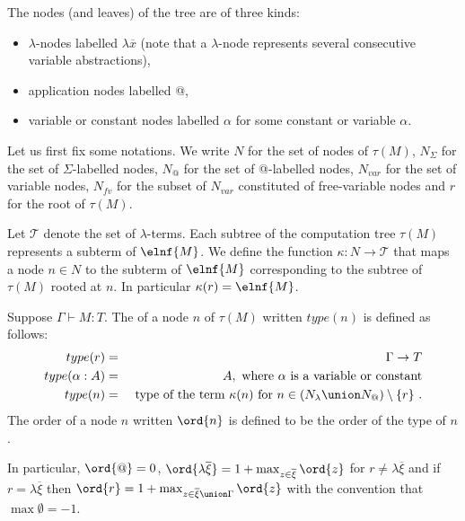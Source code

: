The nodes (and leaves) of the tree are of three kinds:
\begin{itemize}
\item $\lambda$-nodes labelled $\lambda \overline{x}$ (note that a $\lambda$-node represents several consecutive variable abstractions),
\item application nodes labelled @,
\item variable or constant nodes labelled $\alpha$ for some constant or variable $\alpha$.
\end{itemize}

Let us first fix some notations. We write $N$ for the set of nodes of $\tau(M)$, $N_\Sigma$ for the set of $\Sigma$-labelled nodes,
$N_@$ for the set of @-labelled nodes, $N_{var}$ for the set of variable nodes,
$N_{fv}$ for the subset of $N_{var}$ constituted of free-variable nodes and $r$ for the root of $\tau(M)$.

Let $\mathcal{T}$ denote the set of $\lambda$-terms.
Each subtree of the computation tree $\tau(M)$ represents a subterm of $\elnf{M}$.
We define the function $\kappa : N \rightarrow \mathcal{T}$ that maps a node $n \in N$ to the subterm of $\elnf{M}$
corresponding to the subtree of $\tau(M)$ rooted at $n$.
In particular $\kappa(r) = \elnf{M}$.

\begin{definition}
\label{def:nodeorder}
Suppose $\Gamma \vdash M : T$.
The  of a node $n$ of $\tau(M)$ written $type(n)$ is defined as follows:
\begin{eqnarray*}
type(r) &=& \Gamma \rightarrow T \\
type(\alpha:A) &=& A, \mbox{ where $\alpha$ is a variable or constant} \\
type(n) &=& \hbox{ type of the term $\kappa(n)$ for $n \in (N_\lambda \union N_@) \setminus \{r \}$\ .}
\end{eqnarray*}
The order of a node $n$ written $\ord{n}$ is defined to be the order of the type of $n$.
\end{definition}

In particular, $\ord{@} = 0$, $\ord{\lambda \overline{\xi}} = 1+ \max_{z\in \overline{\xi}} \ord{z}$ for $r \neq \lambda \overline{\xi}$
and if $r=\lambda \overline{\xi}$ then $\ord{r} = 1 + \max_{z\in \overline{\xi}\union \Gamma} \ord{z}$ with the convention that $\max \emptyset = -1$.

